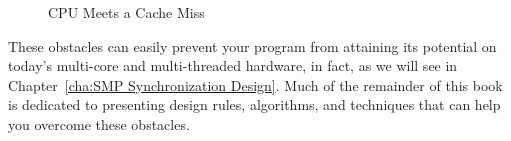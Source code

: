 \begin{figure}[htb]
\begin{center}
\end{center}
\caption{CPU Meets a Cache Miss}
\label{fig:intro:CPU Meets a Cache Miss}
\end{figure}

These obstacles can easily prevent your program from attaining its
potential on today's multi-core and multi-threaded hardware,
in fact, as we will see in Chapter~\ref{cha:SMP Synchronization Design}.
Much of the remainder of this book is dedicated to presenting
design rules, algorithms, and techniques that can help you
overcome these obstacles.
